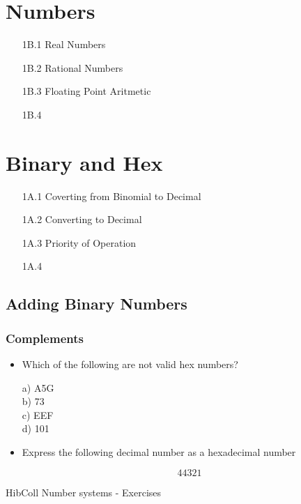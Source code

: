 \documentclass{article}
\begin{document}
\section*{Numbers}
\begin{itemize}
\item[1B.1] Real Numbers
\item[1B.2] Rational Numbers
\item[1B.3] Floating Point Aritmetic
\item[1B.4] 
\end{itemize}
\section*{Binary and Hex}
\begin{itemize}
\item[1A.1] Coverting from Binomial to Decimal
\item[1A.2] Converting to Decimal
\item[1A.3] Priority of Operation
\item[1A.4] 
\end{itemize}
\newpage
\subsection*{Adding Binary Numbers}



\subsubsection*{Complements}
\begin{itemize}
\item Which of the following are not valid hex numbers?

a) A5G 	\\
b) 73\\
c) EEF\\	
d) 101\\

\item Express the following decimal number as a hexadecimal number

\[44321\]


\end{itemize}


HibColl Number systems - Exercises
\end{document}
